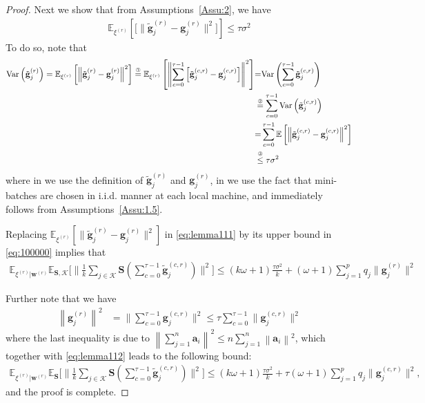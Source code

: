 \documentclass[sigconf, anonymous, review]{acmart}
\begin{document}
\begin{proof}
Next we show that from Assumptions~\ref{Assu:2}, we have 
\begin{align}\label{eq:100000}
    \mathbb{E}_{\xi^{(r)}}\left[\Big[\|{\tilde{\mathbf{g}}_j^{(r)}}-{\mathbf{g}_j^{(r)}}\|^2\Big]\right]\leq \tau \sigma^2
\end{align}
To do so, note that 
\begin{align}
    \text{Var}\left(\tilde{\mathbf{g}}_{j}^{(r)}\right)=\mathbb{E}_{\xi^{(r)}}\left[\left\|{\tilde{\mathbf{g}}_j^{(r)}}-{\mathbf{g}_j^{(r)}}\right\|^2\right]  \stackrel{\text{\ding{192}}}{=}\mathbb{E}_{\xi^{(r)}}\left[\left\|\sum_{c=0}^{\tau-1}\left[\tilde{\mathbf{g}}_j^{(c,r)}-\mathbf{g}_j^{(c,r)}\right]\right\|^2\right]&{=}\text{Var}\left(\sum_{c=0}^{\tau-1}\tilde{\mathbf{g}}_j^{(c,r)}\right)\nonumber\\
    &\stackrel{\text{\ding{193}}}{=}\sum_{c=0}^{\tau-1}\text{Var}\left(\tilde{\mathbf{g}}_j^{(c,r)}\right)\nonumber\\
    &{=}\sum_{c=0}^{\tau-1}\mathbb{E}\left[\left\|\tilde{\mathbf{g}}_j^{(c,r)}-\mathbf{g}_j^{(c,r)}\right\|^2\right]\nonumber\\
    &\stackrel{\text{\ding{194}}}{\leq}\tau\sigma^2\label{eq:var_b_mid}
    \end{align}
where in  we use the definition of ${\tilde{\mathbf{g}}}_j^{(r)}$ and ${{\mathbf{g}}}_j^{(r)}$, in  we use the fact that mini-batches are chosen in i.i.d. manner at each local machine, and  immediately follows from Assumptions~\ref{Assu:1.5}.

Replacing $\mathbb{E}_{\xi^{(r)}}\left[\|{\tilde{\mathbf{g}}_j^{(r)}}-{\mathbf{g}_j^{(r)}}\|^2\right]$ in \eqref{eq:lemma111} by its upper bound in \eqref{eq:100000} implies that 
\begin{align}
\mathbb{E}_{{\xi^{(r)}|\boldsymbol{w}^{(r)}}}\mathbb{E}_{\mathbf{S},\mathcal{K}}\Big[\|\frac{1}{k}\sum_{j\in\mathcal{K}} \mathbf{S}\left(\sum_{c=0}^{\tau-1}\tilde{\mathbf{g}}^{(c,r)}_j\right)\|^2\Big]
\leq (k\omega+1)\frac{\tau\sigma^2}{k}+(\omega+1)\sum_{j=1}^pq_j\|{\mathbf{g}}_{j}^{(r)}\|^2\label{eq:lemma112}
\end{align}

Further note that we have 
\begin{align}
\left\|{\mathbf{g}}_j^{(r)}\right\|^2&=\|\sum_{c=0}^{\tau-1}\mathbf{g}_j^{(c,r)}\|^2\stackrel{}{\leq} \tau\sum_{c=0}^{\tau-1}\|\mathbf{g}_j^{(c,r)}\|^2\label{eq:mid-bounding-absg}
\end{align} 
where the last inequality is due to $\left\|\sum_{j=1}^n\boldsymbol{a}_i\right\|^2\leq n\sum_{j=1}^n\left\|\boldsymbol{a}_i\right\|^2$, which together with \eqref{eq:lemma112} leads to the following bound:
\begin{align}
    \mathbb{E}_{{\xi^{(r)}|\boldsymbol{w}^{(r)}}}\mathbb{E}_{\mathbf{S}}\Big[\|\frac{1}{k}\sum_{j\in\mathcal{K}} \mathbf{S}\left(\sum_{c=0}^{\tau-1}\tilde{\mathbf{g}}^{(c,r)}_j\right)\|^2\Big]\leq(k\omega+1)\frac{\tau\sigma^2}{k}+\tau({\omega}+1)\sum_{j=1}^pq_j\|{\mathbf{g}}_{j}^{(c,r)}\|^2,
\end{align}
and the proof is complete.
\end{proof}
\end{document}
